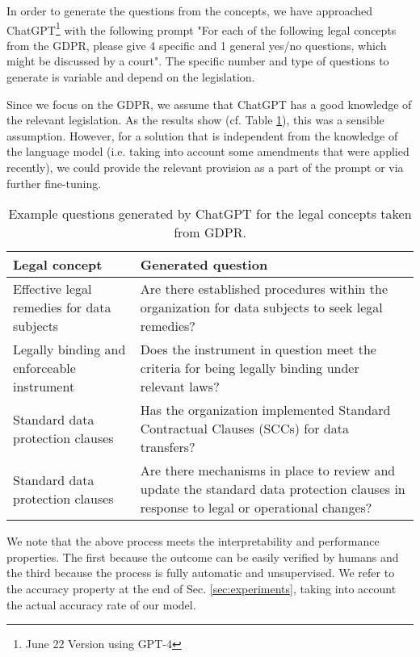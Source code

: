 In order to generate the questions from the concepts, we have approached ChatGPT\footnote{June 22 Version using GPT-4} with the following prompt "For each of the following legal concepts from the GDPR, please give 4 specific and 1 general yes/no questions, which might be discussed by a court". The specific number and type of questions to generate is variable and depend on the legislation.

Since we focus on the GDPR, we assume that ChatGPT has a good knowledge of the relevant legislation. As the results show (cf. Table \ref{tab:question-examples}), this was a sensible assumption. However, for a solution that is independent from the knowledge of the language model (i.e. taking into account some amendments that were applied recently), we could provide the
relevant provision as a part of the prompt or via further fine-tuning.

\begin{table}[htbp]
  \centering\begin{tabular}{l p{6cm}}
    \hline
    \textbf{Legal concept} & \textbf{Generated question} \\
\hline
Effective legal remedies for data subjects & Are there established procedures within the organization for data subjects to seek legal remedies?\\
\hline
Legally binding and enforceable instrument & Does the instrument in question meet the criteria for being legally binding under relevant laws?\\
\hline
Standard data protection clauses & Has the organization implemented Standard Contractual Clauses (SCCs) for data transfers?\\
\hline
Standard data protection clauses & Are there mechanisms in place to review and update the standard data protection clauses in response to legal or operational changes?\\
  \end{tabular}
  \caption{Example questions generated by ChatGPT for the legal concepts taken from GDPR.}
  \label{tab:question-examples}
\end{table}

We note that the above process meets the interpretability and performance properties. The first because the outcome can be easily verified by humans and the third because the process is fully automatic and unsupervised. We refer to the accuracy property at the end of Sec. \ref{sec:experiments}, taking into account the actual accuracy rate of our model.

